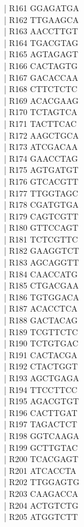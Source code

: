 \documentclass[titlepage,10pt,a4paper,uplatex]{jsbook}
\newenvironment{content}{\begin{shaded}\vspace{-1em}\raggedright\ttfamily\footnotesize\setlength{\baselineskip}{1.4em}}{\end{shaded}\vspace{-1em}}
\begin{document}
\begin{content}
| R161	GGAGATGA\\
| R162	TTGAAGCA\\
| R163	AACCTTGT\\
| R164	TGACGTAG\\
| R165	AGTAGAGT\\
| R166	CACTAGTG\\
| R167	GACACCAA\\
| R168	CTTCTCTC\\
| R169	ACACGAAG\\
| R170	TCTAGTCA\\
| R171	TACTTCAC\\
| R172	AAGCTGCA\\
| R173	ATCGACAA\\
| R174	GAACCTAG\\
| R175	AGTGATGT\\
| R176	GTCACGTT\\
| R177	TTGGTAGC\\
| R178	CGATGTGA\\
| R179	CAGTCGTT\\
| R180	GTTCCAGT\\
| R181	TCTCGTTC\\
| R182	GAAGGTCT\\
| R183	AGCAGGTT\\
| R184	CAACCATG\\
| R185	CTGACGAA\\
| R186	TGTGGACA\\
| R187	ACACCTCA\\
| R188	GACTACAG\\
| R189	TCGTTCTC\\
| R190	TCTGTGAC\\
| R191	CACTACGA\\
| R192	CTACTGGT\\
| R193	AGCTGAGA\\
| R194	TTCCTTCC\\
| R195	AGACGTGT\\
| R196	CACTTGAT\\
| R197	TAGACTCT\\
| R198	GGTCAAGA\\
| R199	GCTTGTAC\\
| R200	TCACGAGT\\
| R201	ATCACCTA\\
| R202	TTGGAGTG\\
| R203	CAAGACCA\\
| R204	ACTGTCTG\\
| R205	ATGGTCTT\\

\end{content}
\end{document}
